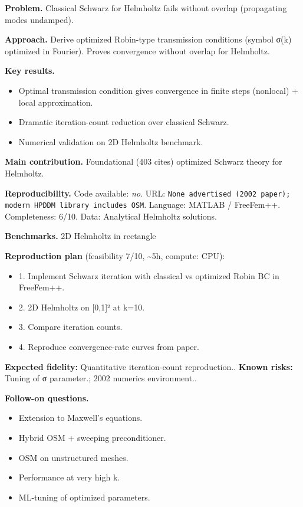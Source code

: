 \documentclass[10pt,letterpaper]{article}
\begin{document}
\textbf{Problem.} Classical Schwarz for Helmholtz fails without overlap (propagating modes undamped).

\textbf{Approach.} Derive optimized Robin-type transmission conditions (symbol σ(k) optimized in Fourier). Proves convergence without overlap for Helmholtz.

\textbf{Key results.}
\begin{itemize}
\item Optimal transmission condition gives convergence in finite steps (nonlocal) + local approximation.
\item Dramatic iteration-count reduction over classical Schwarz.
\item Numerical validation on 2D Helmholtz benchmark.
\end{itemize}

\textbf{Main contribution.} Foundational (403 cites) optimized Schwarz theory for Helmholtz.

\textbf{Reproducibility.} Code available: \emph{no}. URL: \texttt{None advertised (2002 paper); modern HPDDM library includes OSM}. Language: MATLAB / FreeFem++. Completeness: 6/10. Data: Analytical Helmholtz solutions.

\textbf{Benchmarks.} 2D Helmholtz in rectangle

\textbf{Reproduction plan} (feasibility 7/10, \textasciitilde5h, compute: CPU):
\begin{itemize}
\item 1. Implement Schwarz iteration with classical vs optimized Robin BC in FreeFem++.
\item 2. 2D Helmholtz on [0,1]² at k=10.
\item 3. Compare iteration counts.
\item 4. Reproduce convergence-rate curves from paper.
\end{itemize}
\textbf{Expected fidelity:} Quantitative iteration-count reproduction.. \textbf{Known risks:} Tuning of σ parameter.; 2002 numerics environment..

\textbf{Follow-on questions.}
\begin{itemize}
\item Extension to Maxwell's equations.
\item Hybrid OSM + sweeping preconditioner.
\item OSM on unstructured meshes.
\item Performance at very high k.
\item ML-tuning of optimized parameters.
\end{itemize}
\end{document}
